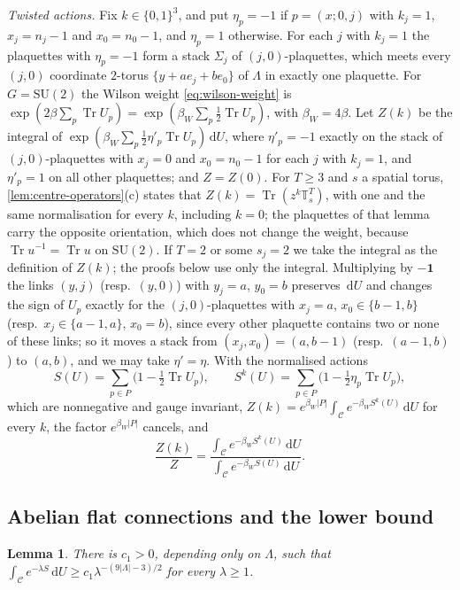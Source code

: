 \documentclass[11pt,a4paper]{amsart}
\newtheorem{lemma}[theorem]{Lemma}
\theoremstyle{definition}
\theoremstyle{remark}
\numberwithin{equation}{section}
\DeclareMathOperator{\Tr}{Tr}        %
\newcommand{\abs}[1]{\lvert #1\rvert}      %
\newcommand{\dd}{\,\mathrm{d}}             %
\newcommand{\SU}{\mathrm{SU}}              %
\newcommand{\TT}{\mathbb{T}}               %
\newcommand{\betaW}{\beta_{W}}             %
\begin{document}
\emph{Twisted actions.} Fix $k\in\{0,1\}^3$, and put $\eta_p=-1$ if $p=(x;0,j)$ with $k_j=1$, $x_j=n_j-1$ and $x_0=n_0-1$, and $\eta_p=1$ otherwise. For each $j$ with $k_j=1$ the plaquettes with $\eta_p=-1$ form a stack $\Sigma_j$ of $(j,0)$-plaquettes, which meets every $(j,0)$ coordinate $2$-torus $\{y+ae_j+be_0\}$ of $\Lambda$ in exactly one plaquette. For $G=\SU(2)$ the Wilson weight \eqref{eq:wilson-weight} is $\exp(2\beta\sum_p\Tr U_p)=\exp(\betaW\sum_p\frac12\Tr U_p)$, with $\betaW=4\beta$. Let $Z(k)$ be the integral of $\exp(\betaW\sum_p\frac12\eta'_p\Tr U_p)\dd U$, where $\eta'_p=-1$ exactly on the stack of $(j,0)$-plaquettes with $x_j=0$ and $x_0=n_0-1$ for each $j$ with $k_j=1$, and $\eta'_p=1$ on all other plaquettes; and $Z=Z(0)$. For $T\ge3$ and $s$ a spatial torus, \cref{lem:centre-operators}\textup{(c)} states that $Z(k)=\Tr(z^k\TT_s^T)$, with one and the same normalisation for every $k$, including $k=0$; the plaquettes of that lemma carry the opposite orientation, which does not change the weight, because $\Tr u^{-1}=\Tr u$ on $\SU(2)$. If $T=2$ or some $s_j=2$ we take the integral as the definition of $Z(k)$; the proofs below use only the integral. Multiplying by $-\mathbf 1$ the links $(y,j)$ (resp.\ $(y,0)$) with $y_j=a$, $y_0=b$ preserves $\dd U$ and changes the sign of $U_p$ exactly for the $(j,0)$-plaquettes with $x_j=a$, $x_0\in\{b-1,b\}$ (resp.\ $x_j\in\{a-1,a\}$, $x_0=b$), since every other plaquette contains two or none of these links; so it moves a stack from $(x_j,x_0)=(a,b-1)$ (resp.\ $(a-1,b)$) to $(a,b)$, and we may take $\eta'=\eta$. With the normalised actions
\begin{equation}\label{eq:mb-actions}
S(U)=\sum_{p\in P}\bigl(1-\tfrac12\Tr U_p\bigr),\qquad S^k(U)=\sum_{p\in P}\bigl(1-\tfrac12\eta_p\Tr U_p\bigr),
\end{equation}
which are nonnegative and gauge invariant, $Z(k)=e^{\betaW\abs P}\int_{\mathcal C}e^{-\betaW S^k(U)}\dd U$ for every $k$, the factor $e^{\betaW\abs P}$ cancels, and
\begin{equation}\label{eq:mb-ratio-integrals}
\frac{Z(k)}{Z}=\frac{\int_{\mathcal C}e^{-\betaW S^k(U)}\dd U}{\int_{\mathcal C}e^{-\betaW S(U)}\dd U}.
\end{equation}

\subsection{Abelian flat connections and the lower bound}

\begin{lemma}\label{lem:mb-lower}
There is $c_1>0$, depending only on $\Lambda$, such that $\int_{\mathcal C}e^{-\lambda S}\dd U\ge c_1\lambda^{-(9\abs\Lambda-3)/2}$ for every $\lambda\ge1$.
\end{lemma}
\end{document}
